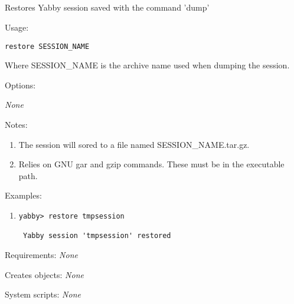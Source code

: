 

\subsection[restor]{  }



Restores Yabby session saved with the command 'dump'


\begin{description}


\item{Usage:}

{\tt restore SESSION\_NAME}

Where SESSION\_NAME is the archive name used when dumping
the session.


\item{Options:}
\begin{description}
{\em None}
\end{description}


\item{Notes:}
\begin{enumerate}
\item The session will sored to a file named SESSION\_NAME.tar.gz.
\item Relies on GNU gar and gzip commands. These must be in the
 executable path.
\end{enumerate}


\item{Examples:}
\begin{enumerate}

\item
\begin{verbatim}
yabby> restore tmpsession

 Yabby session 'tmpsession' restored
\end{verbatim}

\end{enumerate}


\item{Requirements:} {\em None}


\item{Creates objects:} {\em None}


\item{System scripts:} {\em None}

\end{description}

